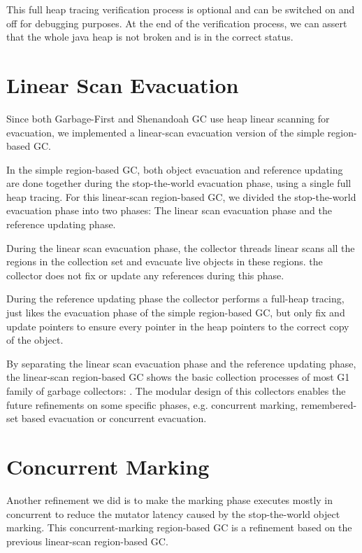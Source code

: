 This full heap tracing verification process is optional and can be switched on and off for
debugging purposes.
At the end of the verification process, we can assert that the whole java heap is
not broken and is in the correct status.

\section{Linear Scan Evacuation}

Since both Garbage-First and Shenandoah GC use heap linear scanning for evacuation,
we implemented a linear-scan evacuation version of the simple region-based GC.

In the simple region-based GC, both object evacuation and reference updating are
done together during the stop-the-world evacuation phase, using a single full heap tracing.
For this linear-scan region-based GC, we divided the stop-the-world evacuation phase into
two phases: The linear scan evacuation phase and the reference updating phase.

During the linear scan evacuation phase, the collector threads linear scans all the regions
in the collection set and evacuate live objects in these regions. the collector does not
fix or update any references during this phase.

During the reference updating phase the collector performs a full-heap tracing,
just likes the evacuation phase of the simple region-based GC, but only fix and update
pointers to ensure every pointer in the heap pointers to the correct copy of the object.

By separating the linear scan evacuation phase and the reference updating phase,
the linear-scan region-based GC shows the basic collection processes of most G1 family
of garbage collectors: .
The modular design of this collectors enables the future refinements on some specific
phases, e.g. concurrent marking, remembered-set based evacuation or concurrent evacuation.

\section{Concurrent Marking}

Another refinement we did is to make the marking phase executes mostly in concurrent to reduce the
mutator latency caused by the stop-the-world object marking.
This concurrent-marking region-based GC is a refinement based on the previous linear-scan region-based GC.

